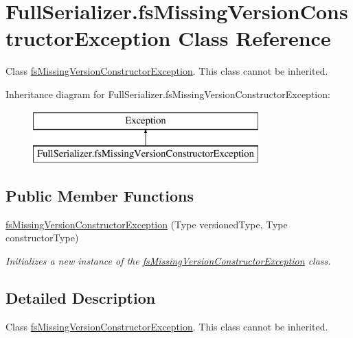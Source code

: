 \hypertarget{class_full_serializer_1_1fs_missing_version_constructor_exception}{}\section{Full\+Serializer.\+fs\+Missing\+Version\+Constructor\+Exception Class Reference}
\label{class_full_serializer_1_1fs_missing_version_constructor_exception}


Class \hyperlink{class_full_serializer_1_1fs_missing_version_constructor_exception}{fs\+Missing\+Version\+Constructor\+Exception}. This class cannot be inherited.  


Inheritance diagram for Full\+Serializer.\+fs\+Missing\+Version\+Constructor\+Exception\+:\begin{figure}[H]
\begin{center}
\leavevmode
\includegraphics[height=2.000000cm]{class_full_serializer_1_1fs_missing_version_constructor_exception}
\end{center}
\end{figure}
\subsection*{Public Member Functions}
\begin{DoxyCompactItemize}
\item 
\hyperlink{class_full_serializer_1_1fs_missing_version_constructor_exception_a4bf3e78b5009a68188abfb9bdc8b4f0f}{fs\+Missing\+Version\+Constructor\+Exception} (Type versioned\+Type, Type constructor\+Type)
\begin{DoxyCompactList}\small\item\em Initializes a new instance of the \hyperlink{class_full_serializer_1_1fs_missing_version_constructor_exception}{fs\+Missing\+Version\+Constructor\+Exception} class. \end{DoxyCompactList}\end{DoxyCompactItemize}


\subsection{Detailed Description}
Class \hyperlink{class_full_serializer_1_1fs_missing_version_constructor_exception}{fs\+Missing\+Version\+Constructor\+Exception}. This class cannot be inherited. 

